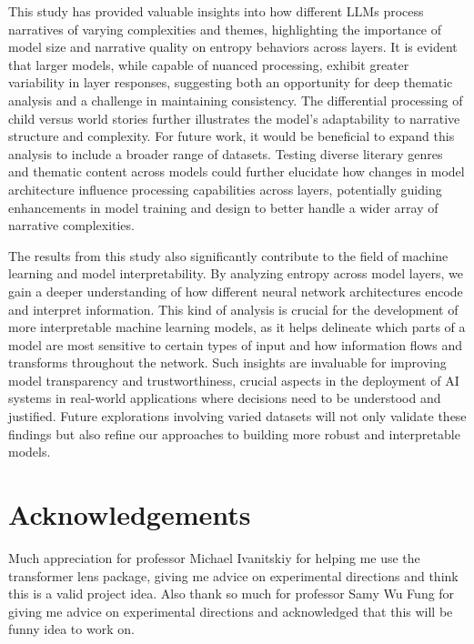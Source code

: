 \documentclass{article}
\begin{document}
This study has provided valuable insights into how different LLMs process narratives of varying complexities and themes, highlighting the importance of model size and narrative quality on entropy behaviors across layers. It is evident that larger models, while capable of nuanced processing, exhibit greater variability in layer responses, suggesting both an opportunity for deep thematic analysis and a challenge in maintaining consistency. The differential processing of child versus world stories further illustrates the model's adaptability to narrative structure and complexity. For future work, it would be beneficial to expand this analysis to include a broader range of datasets. Testing diverse literary genres and thematic content across models could further elucidate how changes in model architecture influence processing capabilities across layers, potentially guiding enhancements in model training and design to better handle a wider array of narrative complexities.

The results from this study also significantly contribute to the field of machine learning and model interpretability. By analyzing entropy across model layers, we gain a deeper understanding of how different neural network architectures encode and interpret information. This kind of analysis is crucial for the development of more interpretable machine learning models, as it helps delineate which parts of a model are most sensitive to certain types of input and how information flows and transforms throughout the network. Such insights are invaluable for improving model transparency and trustworthiness, crucial aspects in the deployment of AI systems in real-world applications where decisions need to be understood and justified. Future explorations involving varied datasets will not only validate these findings but also refine our approaches to building more robust and interpretable models.







\section{Acknowledgements}
Much appreciation for professor Michael Ivanitskiy for helping me use the transformer lens package, giving me advice on experimental directions and think this is a valid project idea. Also thank so much for professor Samy Wu Fung for giving me advice on experimental directions and acknowledged that this will be funny idea to work on.











\end{document}
